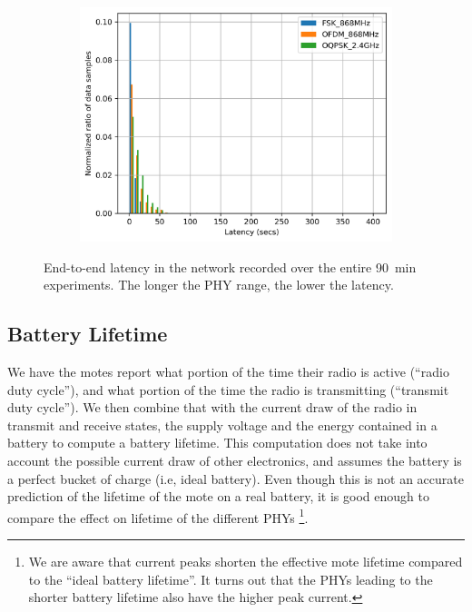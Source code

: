 \documentclass[sensors,article,submit,moreauthors,pdftex]{Definitions/mdpi}
\newcommand{\mina}[1]       {\textbf{\textcolor{blue}{[Mina] #1}}}
\begin{document}
\begin{figure}
\begin{subfigure}{0.49\columnwidth}
    	\includegraphics[width=1.00\columnwidth]{latency_pdf}
    	\label{fig:latency_pdf}
	\end{subfigure}
	\caption{
	    End-to-end latency in the network recorded over the entire 90~min experiments.
	    The longer the PHY range, the lower the latency.
	}
	\label{fig:latency_all}
\end{figure}

\subsection{Battery Lifetime}
\label{sec:res_lifetime}


We have the motes report what portion of the time their radio is active (``radio duty cycle''), and what portion of the time the radio is transmitting (``transmit duty cycle'').
We then combine that with the current draw of the radio in transmit and receive states, the supply voltage and the energy contained in a battery to compute a battery lifetime.
This computation does not take into account the possible current draw of other electronics, and assumes the battery is a perfect bucket of charge (i.e, ideal battery).
Even though this is not an accurate prediction of the lifetime of the mote on a real battery, it is good enough to compare the effect on lifetime of the different PHYs 
    \footnote{We are aware that current peaks shorten the effective mote lifetime compared to the ``ideal battery lifetime''.
    It turns out that the PHYs leading to the shorter battery lifetime also have the higher peak current.}.
\end{document}
